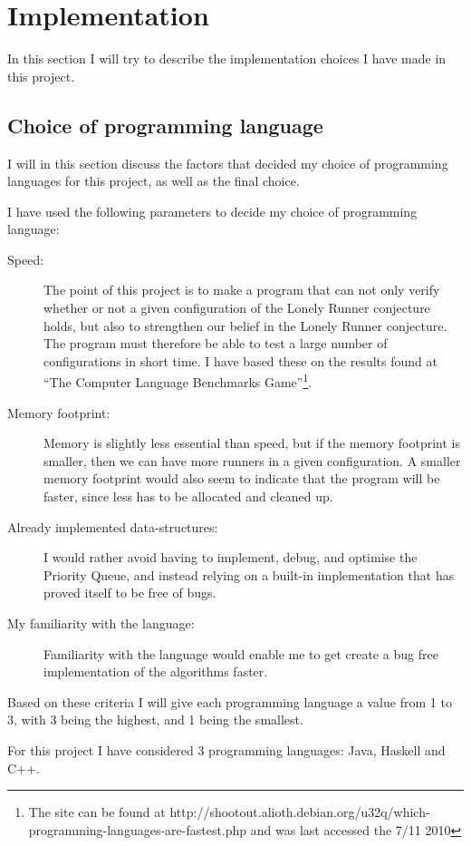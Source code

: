 \section{Implementation}
\label{implementation}

In this section I will try to describe the implementation choices I have made in this project.

\subsection{Choice of programming language}
I will in this section discuss the factors that decided my choice of programming languages for this project, as well as the final choice.

I have used the following parameters to decide my choice of programming language:
\begin{description}
\item[Speed:] The point of this project is to make a program that can not only verify whether or not a given configuration of the Lonely Runner conjecture holds, but also to strengthen our belief in the Lonely Runner conjecture. The program must therefore be able to test a large number of configurations in short time. I have based these on the results found at ``The Computer Language Benchmarks Game''\footnote{The site can be found at http://shootout.alioth.debian.org/u32q/which-programming-languages-are-fastest.php and was last accessed the 7/11 2010}.
\item[Memory footprint:] Memory is slightly less essential than speed, but if the memory footprint is smaller, then we can have more runners in a given configuration. A smaller memory footprint would also seem to indicate that the program will be faster, since less has to be allocated and cleaned up. 
\item[Already implemented data-structures:] I would rather avoid having to implement, debug, and optimise the Priority Queue, and instead relying on a built-in implementation that has proved itself to be free of bugs.
\item[My familiarity with the language:] Familiarity with the language would enable me to get create a bug free implementation of the algorithms faster.
\end{description}

Based on these criteria I will give each programming language a value from 1 to 3, with 3 being the highest, and 1 being the smallest. 

For this project I have considered 3 programming languages: Java, Haskell and C++.

